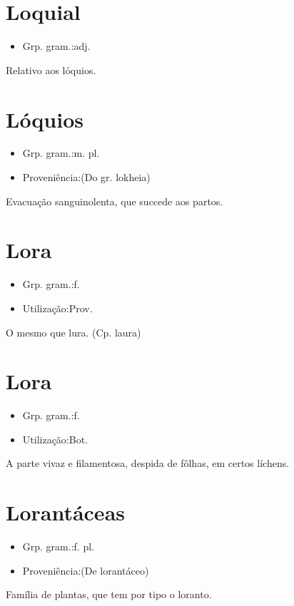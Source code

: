 \section{Loquial}
\begin{itemize}
\item {Grp. gram.:adj.}
\end{itemize}
Relativo aos lóquios.
\section{Lóquios}
\begin{itemize}
\item {Grp. gram.:m. pl.}
\end{itemize}
\begin{itemize}
\item {Proveniência:(Do gr. \textunderscore lokheia\textunderscore )}
\end{itemize}
Evacuação sanguinolenta, que succede aos partos.
\section{Lora}
\begin{itemize}
\item {Grp. gram.:f.}
\end{itemize}
\begin{itemize}
\item {Utilização:Prov.}
\end{itemize}
O mesmo que \textunderscore lura\textunderscore .
(Cp. \textunderscore laura\textunderscore )
\section{Lora}
\begin{itemize}
\item {Grp. gram.:f.}
\end{itemize}
\begin{itemize}
\item {Utilização:Bot.}
\end{itemize}
A parte vivaz e filamentosa, despida de fôlhas, em certos líchens.
\section{Lorantáceas}
\begin{itemize}
\item {Grp. gram.:f. pl.}
\end{itemize}
\begin{itemize}
\item {Proveniência:(De \textunderscore lorantáceo\textunderscore )}
\end{itemize}
Família de plantas, que tem por tipo o loranto.
